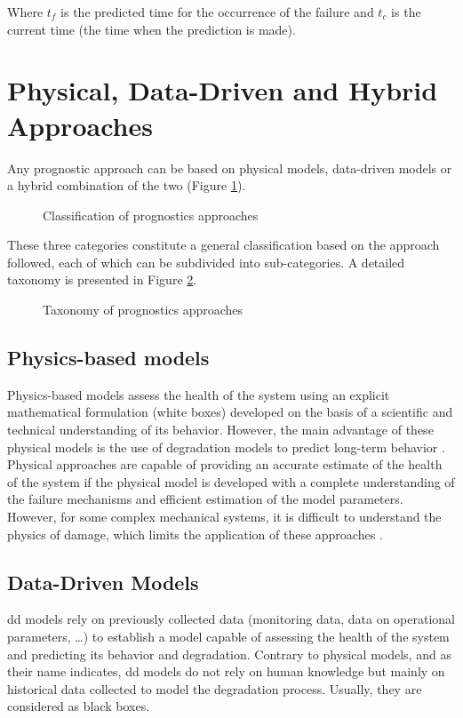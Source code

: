 Where $t_f$ is the predicted time for the occurrence of the failure and $t_c$ is the current time (the time when the prediction is made).

\section{Physical, Data-Driven and Hybrid Approaches}
\label{section:prognostics-approaches}
Any prognostic approach can be based on physical models, data-driven models or a hybrid combination of the two (Figure \ref{fig:prognostic-approaches-venn}).

\begin{figure}[ht]
    \centering
	
    \caption{Classification of prognostics approaches}
    \label{fig:prognostic-approaches-venn}
\end{figure}

These three categories constitute a general classification based on the approach followed, each of which can be subdivided into sub-categories. A detailed taxonomy is presented in Figure \ref{fig:prognostic-approaches-tree}.

\begin{figure}[ht]
	\resizebox{\textwidth}{!}{}
    \caption{Taxonomy of prognostics approaches \cite{Javed2017}}
    \label{fig:prognostic-approaches-tree}
\end{figure}


\subsection{Physics-based models}
Physics-based models assess the health of the system using an explicit mathematical formulation (white boxes) developed on the basis of a scientific and technical understanding of its behavior. However, the main advantage of these physical models is the use of degradation models to predict long-term behavior \cite{Cubillo2016}. Physical approaches are capable of providing an accurate estimate of the health of the system if the physical model is developed with a complete understanding of the failure mechanisms and efficient estimation of the model parameters. However, for some complex mechanical systems, it is difficult to understand the physics of damage, which limits the application of these approaches \cite{Lei2018}.

\subsection{Data-Driven Models}
\acrlong{dd}  models rely on previously collected data (monitoring data, data on operational parameters, …) to establish a model capable of assessing the health of the system and predicting its behavior and degradation. Contrary to physical models, and as their name indicates, \acrlong{dd} models do not rely on human knowledge but mainly on historical data collected to model the degradation process. Usually, they are considered as black boxes.

